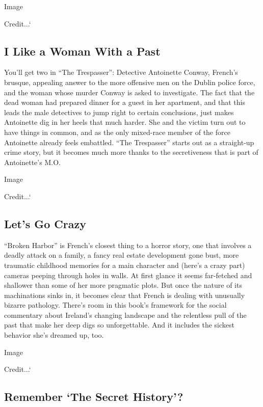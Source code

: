 Image

Credit...`

\hypertarget{i-like-a-woman-with-a-past}{%
\subsection{I Like a Woman With a
Past}\label{i-like-a-woman-with-a-past}}

You'll get two in ``The Trespasser'': Detective Antoinette Conway,
French's brusque, appealing answer to the more offensive men on the
Dublin police force, and the woman whose murder Conway is asked to
investigate. The fact that the dead woman had prepared dinner for a
guest in her apartment, and that this leads the male detectives to jump
right to certain conclusions, just makes Antoinette dig in her heels
that much harder. She and the victim turn out to have things in common,
and as the only mixed-race member of the force Antoinette already feels
embattled. ``The Trespasser'' starts out as a straight-up crime story,
but it becomes much more thanks to the secretiveness that is part of
Antoinette's M.O.

Image

Credit...`

\hypertarget{lets-go-crazy}{%
\subsection{Let's Go Crazy}\label{lets-go-crazy}}

``Broken Harbor'' is French's closest thing to a horror story, one that
involves a deadly attack on a family, a fancy real estate development
gone bust, more traumatic childhood memories for a main character and
(here's a crazy part) cameras peeping through holes in walls. At first
glance it seems far-fetched and shallower than some of her more
pragmatic plots. But once the nature of its machinations sinks in, it
becomes clear that French is dealing with unusually bizarre pathology.
There's room in this book's framework for the social commentary about
Ireland's changing landscape and the relentless pull of the past that
make her deep digs so unforgettable. And it includes the sickest
behavior she's dreamed up, too.

Image

Credit...`

\hypertarget{remember-the-secret-history}{%
\subsection{Remember `The Secret
History'?}\label{remember-the-secret-history}}

